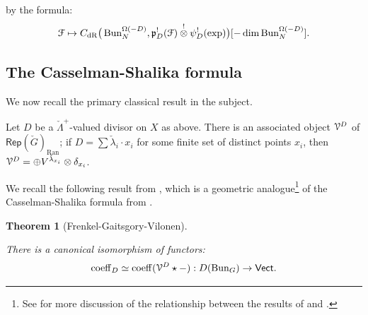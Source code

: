\documentclass[reqno,11pt]{amsart}
\numberwithin{equation}{subsection}
\newtheorem{thm}{Theorem}[subsubsection]
\theoremstyle{remark}
\newcommand{\sF}{{\EuScript F}}
\newcommand{\sV}{{\EuScript V}}
\newcommand{\fp}{{\mathfrak p}}
\newcommand{\on}{\operatorname}
\newcommand{\Rep}{\mathsf{Rep}}
\newcommand{\Vect}{\mathsf{Vect}}
\newcommand{\Bun}{\on{Bun}}
\newcommand{\coeff}{\on{coeff}}
\newcommand{\Ran}{\on{Ran}}
\newcommand{\dR}{\on{dR}}
\begin{document}
\noindent by the formula:
%
\[
\sF \mapsto 
C_{\dR}\big(\Bun_N^{\Omega(-D)},\fp_D^!(\sF) \overset{!}{\otimes} \psi_D^!(\exp)\big)
[-\dim \Bun_N^{\Omega(-D)}].
\]

\subsection{The Casselman-Shalika formula}\label{ss:cs}

We now recall the primary classical result in the subject.

Let $D$ be a $\check{\Lambda}^+$-valued divisor on $X$ as above. 
There is an associated object $\sV^D$ of $\Rep(\check{G})_{\Ran}$;
if $D = \sum \check{\lambda}_i \cdot x_i$ for some finite
set of distinct points $x_i$, then 
$\sV^D = \oplus V^{\check{\lambda}_{x_i}} \otimes  \delta_{x_i}$.

We recall the following result from \cite{fgv}, which is a
geometric analogue\footnote{See \cite{fgkv} for more discussion 
of the relationship between the results of \cite{fgv} and \cite{casselman-shalika}.} 
of the Casselman-Shalika formula from \cite{casselman-shalika}.

\begin{thm}[Frenkel-Gaitsgory-Vilonen]\label{t:cs}

There is a canonical isomorphism of functors:
%
\[
\coeff_D \simeq \coeff(\sV^D \star -): D(\Bun_G) \to \Vect.
\]

\end{thm}
\end{document}
